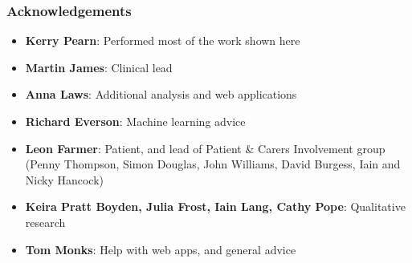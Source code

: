 \begin{frame}
\frametitle{Acknowledgements}

\begin{itemize}
    \setlength{\itemsep}{4mm}
    \item \textbf{Kerry Pearn}: Performed most of the work shown here
    \item \textbf{Martin James}: Clinical lead
    \item \textbf{Anna Laws}: Additional analysis and web applications
    \item \textbf{Richard Everson}: Machine learning advice
    \item \textbf{Leon Farmer}: Patient, and lead of Patient \& Carers Involvement group (Penny Thompson, Simon Douglas, John Williams, David Burgess, Iain and Nicky Hancock)
    \item \textbf{Keira Pratt Boyden, Julia Frost, Iain Lang, Cathy Pope}: Qualitative research
    \item \textbf{Tom Monks}: Help with web apps, and general advice
\end{itemize}
\end{frame}